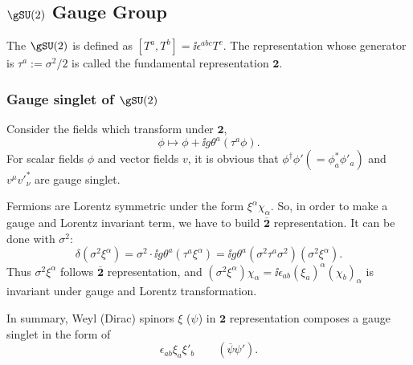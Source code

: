 \subsection{$\gSU(2)$ Gauge Group}
The $\gSU(2)$ is defined as $[T^a,T^b]=\ii\epsilon^{abc}T^c$.
The representation whose generator is $\tau^a:=\sigma^2/2$ is called the fundamental representation $\boldsymbol 2$.
\subsubsection{Gauge singlet of $\gSU(2)$}
Consider the fields which transform under $\boldsymbol2$,
\begin{equation}
 \phi\mapsto \phi+\ii g\theta^a\left(\tau^a\phi\right).
\end{equation}
For scalar fields $\phi$ and vector fields $v$, it is obvious that $\phi^\dagger\phi' (=\phi^*_a \phi'_a)$ and $v^\mu v'^*_\nu$ are gauge singlet.

Fermions are Lorentz symmetric under the form
 $\xi^\alpha\chi_\alpha$.
So, in order to make a gauge and Lorentz invariant term, we have to build $\overline{\boldsymbol 2}$ representation. It can be done with $\sigma^2$:
\begin{equation}
 \delta(\sigma^2\xi^\alpha) =
\sigma^2\cdot\ii g\theta^a\left(\tau^a\xi^\alpha\right)
=
\ii g\theta^a\left(\sigma^2\tau^a\sigma^2\right)\left(\sigma^2\xi^\alpha\right).
\end{equation}
Thus $\sigma^2\xi^\alpha$ follows $\overline{\boldsymbol 2}$ representation, and
$(\sigma^2\xi^\alpha)\chi_\alpha=\ii\epsilon_{ab}(\xi_a)^\alpha(\chi_b)_\alpha$ is invariant under gauge and Lorentz transformation.

In summary, Weyl (Dirac) spinors $\xi$ ($\psi$) in ${\boldsymbol 2}$ representation composes a gauge singlet in the form of
\begin{equation}
 \epsilon_{ab}\xi_a\xi'_b \qquad (\overline\psi \psi').
\end{equation}

